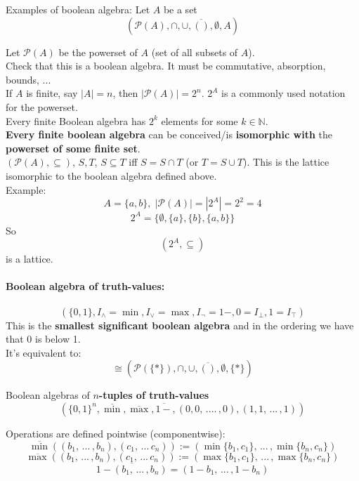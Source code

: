 \documentclass[11pt]{article}
\begin{document}
	\newpage
	
	Examples of boolean algebra: Let $A$ be a set
	$$ (\mathcal{P}(A), \cap, \cup, \overline{()}, \emptyset, A) $$
	
	Let $\mathcal{P}(A)$ be the powerset of $A$ (set of all subsets of $A$).\\
	Check that this is a boolean algebra. It must be commutative, absorption, bounds, ...\\
	
	If $A$ is finite, say $|A| = n$, then $|\mathcal{P}(A)| = 2^n$. $2^A$ is a commonly used notation for the powerset.\\
	
	Every finite Boolean algebra has $2^k$ elements for some $k \in \mathbb{N}$.\\
	
	\textbf{Every finite boolean algebra} can be conceived/is \textbf{isomorphic with} the \textbf{powerset of some finite set}.\\
	
	$(\mathcal{P}(A), \subseteq)$, $S,T$, $S \subseteq T$ iff $S = S \cap T$ (or $T = S \cup T$). This is the lattice isomorphic to the boolean algebra defined above.\\
	
	Example:
	$$A = \{a,b\}, \; |\mathcal{P} (A)| = |2^A| = 2^2 = 4$$
	$$ 2^A = \{\emptyset, \{a\}, \{b\}, \{a,b\}\} $$
	So 
	$$ (2^A, \subseteq)$$
	is a lattice.\\
	
	
	\newpage
	
	\paragraph{Boolean algebra of truth-values:}
	$$ (\{0,1\}, I_\wedge = \min, I_\vee = \max, I_\neg = 1-, 0 = I_\bot, 1 = I_\top) $$
	This is the \textbf{smallest significant boolean algebra} and in the ordering we have that 0 is below 1.\\
	
	It's equivalent to:
	$$ \cong (\mathcal{P}(\{\ast\}), \cap, \cup, \overline{()}, \emptyset, \{\ast\}) $$
	
	Boolean algebras of \textbf{$n$-tuples of truth-values}
	$$ (\{0,1\}^n, \overline{\min}, \overline{\max}, \overline{1-}, (0,0, \, .... \, , 0), (1,1, \, ... \, , 1)) $$
	
	Operations are defined pointwise (componentwise):
	$$ \overline{\min} ((b_1, \, ... \, , b_n), (c_1, \, ... \, c_n)) := (\min \{b_1, c_1\}, \, ... \, , \min \{b_n, c_n\})$$
	$$ \overline{\max} ((b_1, \, ... \, , b_n), (c_1, \, ... \, c_n)) := (\max \{b_1, c_1\}, \, ... \, , \max \{b_n, c_n\})$$
	$$ \overline{1 - (b_1, \, ... \, , b_n)} = (1-b_1, \, ... \, , 1-b_n) $$
	
\end{document}
